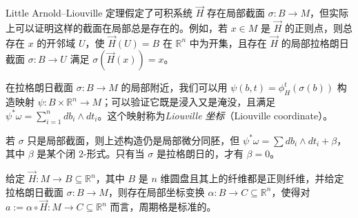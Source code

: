 
\begin{exercise*}
Little Arnold--Liouville 定理假定了可积系统 $\vec{H}$ 存在局部截面 $\sigma\colon B\to M$，但实际上可以证明这样的截面在局部总是存在的。例如，若 $x\in M$ 是 $\vec{H}$ 的正则点，则总存在 $x$ 的开邻域 $U$，使 $\vec{H}(U)=B$ 在 $\mathbb{R}^n$ 中为开集，且存在 $\vec{H}$ 的局部拉格朗日截面 $\sigma\colon B\to U$ 满足 $\sigma (\vec{H} (x))=x$。
\end{exercise*}


在拉格朗日截面 $\sigma\colon B\to M$ 的局部附近，我们可以用 $\psi (b,t)=\phi_H^t (\sigma(b))$ 构造映射 $\psi\colon B\times\mathbb{R}^n\to M$；可以验证它既是浸入又是淹没，且满足 $\psi^{\ast}\omega =\displaystyle\sum_{i=1}^n db_i\wedge dt_i$。这个映射称为\emph{Liouville 坐标}（Liouville coordinate）。


\begin{remark*}
若 $\sigma$ 只是局部截面，则上述构造仍是局部微分同胚，但 $\psi^{\ast}\omega =\sum db_i\wedge dt_i +\beta$，其中 $\beta$ 是某个闭 $2$-形式。只有当 $\sigma$ 是拉格朗日的，才有 $\beta=0$。
\end{remark*}


\begin{theorem*}[作用-角坐标]
给定 $\vec{H}\colon M\to B\subseteq\mathbb{R}^n$，其中 $B$ 是 $n$ 维圆盘且其上的纤维都是正则纤维，并给定拉格朗日截面 $\sigma\colon B\to M$，则存在局部坐标变换 $\alpha\colon B\to C\subseteq\mathbb{R}^n$，使得对 $a:=\alpha\circ\vec{H}\colon M\to C\subseteq\mathbb{R}^n$ 而言，周期格是标准的。
\end{theorem*}

